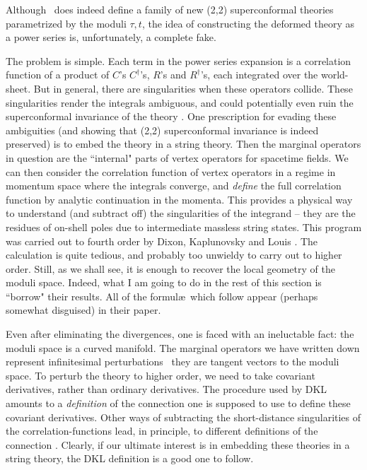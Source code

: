 Although \Pert\ does indeed define a family of new (2,2) superconformal
theories parametrized by the moduli $\tau,t$, the idea of constructing the
deformed theory as a power series is, unfortunately, a complete fake.

The problem is simple. Each term in the power series expansion is a correlation
function of a product of $C$'s $C^\dagger$'s,
$R$'s and $R^\dagger$'s, each integrated over the world-sheet. But in general,
there are singularities when these operators collide. These singularities
render the integrals ambiguous, and could potentially even ruin the
superconformal invariance of the theory \GrSei.  One prescription for evading
these ambiguities (and showing that (2,2) superconformal invariance is indeed
preserved) is to embed the theory in a string theory. Then the marginal
operators in question are the ``internal" parts of vertex operators for
spacetime fields. We can then consider the correlation function of vertex
operators in a regime in momentum space where the integrals converge, and
{\it define} the full correlation function by analytic continuation in the
momenta. This provides a physical way to understand (and subtract off)
the singularities of the
integrand -- they are the residues of on-shell poles due to intermediate
massless string states. This program was carried out to fourth order by Dixon,
Kaplunovsky and Louis \DKL. The calculation is quite tedious, and probably too
unwieldy to carry out to higher order. Still, as we shall see, it is enough
to recover the local geometry of the moduli space. Indeed, what I am going to
do in the rest of this section is ``borrow" their results. All of the
formul\ae\
which follow appear (perhaps somewhat disguised) in their paper.

Even after eliminating the divergences, one is faced with an ineluctable
fact: the moduli space is a curved manifold. The marginal operators we have
written down represent infinitesimal perturbations \ie\ they are tangent
vectors to the moduli space. To perturb the theory to higher order, we need to
take covariant derivatives, rather than ordinary derivatives. The procedure
used by DKL amounts to a {\it definition} of the connection
one is supposed to use to define these covariant derivatives. Other ways of
subtracting the short-distance singularities of the
correlation-functions lead, in principle, to different definitions of the
connection \Kutconf. Clearly, if our ultimate interest is in embedding these
theories in a string theory, the DKL definition is a good one to follow.

